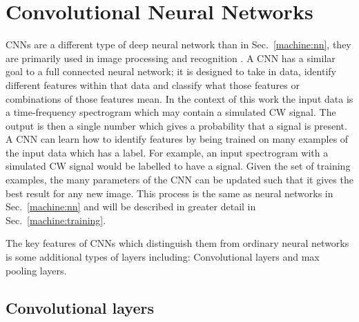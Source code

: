 \section{\label{machine:cnn}Convolutional Neural Networks}

\glspl{CNN} are a different type of deep neural network than in Sec.~\ref{machine:nn}, they are primarily used in image processing and recognition
\cite{lecun2015DeepLearning,lecun1998GradientbasedLearning,waibel1989PhonemeRecognition,krizhevsky2012ImageNetClassificationa}.
A \gls{CNN} has a similar goal to a full connected neural network; it is designed to take in data, identify different features within that data and classify what those features or combinations of those features mean.
In the context of this work the input data is a time-frequency spectrogram which may contain a simulated \gls{CW} signal.
The output is then a single number which gives a probability that a signal is present.
A \gls{CNN} can learn how to identify features by being trained on many
examples of the input data which has a label.
For example, an input spectrogram with a simulated \gls{CW} signal would be labelled to have a signal.
Given the set of training examples, the many parameters of the \gls{CNN} can
be updated such that it gives the best result for any new image. 
This process is the same as neural networks in Sec.~\ref{machine:nn} and will be described in greater detail in Sec.~\ref{machine:training}.

The key features of \glspl{CNN} which distinguish them from ordinary neural networks is some additional types of layers including: Convolutional layers and max pooling layers. 


\subsection{Convolutional layers}

